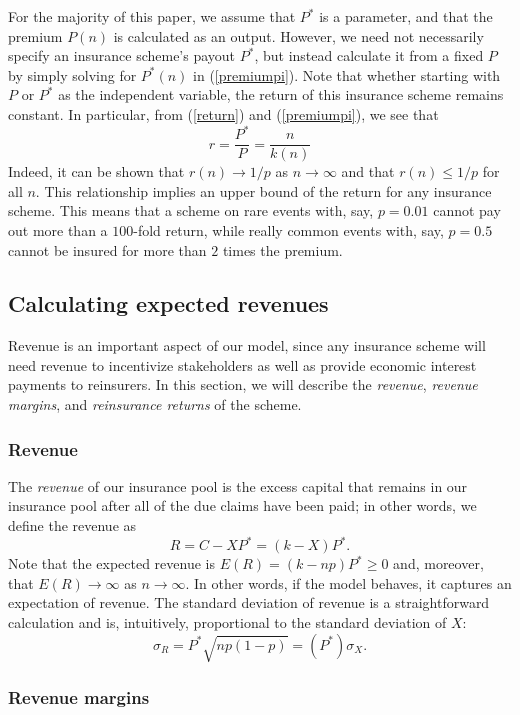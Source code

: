 \documentclass[12pt]{article}
\begin{document}
For the majority of this paper, we assume that $P^*$ is a parameter, and that the premium $P(n)$ is calculated as an output. However, we need not necessarily specify an insurance scheme's payout $P^*$, but instead calculate it from a fixed $P$ by simply solving for $P^*(n)$ in (\ref{premiumpi}). Note that whether starting with $P$ or $P^*$ as the independent variable, the return of this insurance scheme remains constant. In particular, from (\ref{return}) and (\ref{premiumpi}), we see that
$$r = \frac{P^*}{P} = \frac{n}{k(n)}$$
\noindent Indeed, it can be shown that $r(n) \to 1/p$ as $n\to\infty$ and that $r(n) \leq 1/p$ for all $n$. This relationship implies an upper bound of the return for any insurance scheme. This means that a scheme on rare events with, say, $p=0.01$ cannot pay out more than a $100$-fold return, while really common events with, say, $p=0.5$ cannot be insured for more than $2$ times the premium.

\subsection{Calculating expected revenues}

Revenue is an important aspect of our model, since any insurance scheme will need revenue to incentivize stakeholders as well as provide economic interest payments to reinsurers. In this section, we will describe the \textit{revenue}, \textit{revenue margins}, and \textit{reinsurance returns} of the scheme. 

\subsubsection{Revenue}

The \textit{revenue} of our insurance pool is the excess capital that remains in our insurance pool after all of the due claims have been paid; in other words, we define the revenue as
\begin{equation}
    \label{revenue}
    R = C-XP^* = \left(k-X\right)P^*.
\end{equation}
Note that the expected revenue is $E(R)=(k-np)P^*\geq 0$ and, moreover, that $E(R)\to\infty$ as $n\to\infty$. In other words, if the model behaves, it captures an expectation of revenue. The standard deviation of revenue is a straightforward calculation and is, intuitively, proportional to the standard deviation of $X$: $$\sigma_R = P^*\sqrt{np(1-p)} = (P^*)\sigma_X.$$ 

\subsubsection{Revenue margins}
\end{document}
